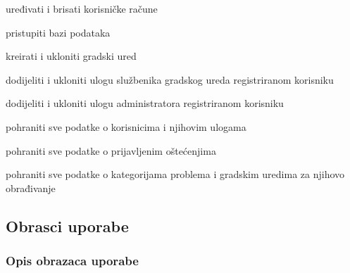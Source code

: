 \begin{packed_enum}
	\begin{packed_enum}

		\item uređivati i brisati korisničke račune
		\item pristupiti bazi podataka
		\item kreirati i ukloniti gradski ured
		\item dodijeliti i ukloniti ulogu službenika gradskog ureda registriranom korisniku 
		\item dodijeliti i ukloniti ulogu administratora registriranom korisniku 
	\end{packed_enum}

	\item {}

	\begin{packed_enum}

		\item pohraniti sve podatke o korisnicima i njihovim ulogama
		\item pohraniti sve podatke o prijavljenim oštećenjima
		\item pohraniti sve podatke o kategorijama problema i gradskim uredima za njihovo obrađivanje

	\end{packed_enum}

\end{packed_enum}


\eject



\subsection{Obrasci uporabe}

\subsubsection{Opis obrazaca uporabe}

